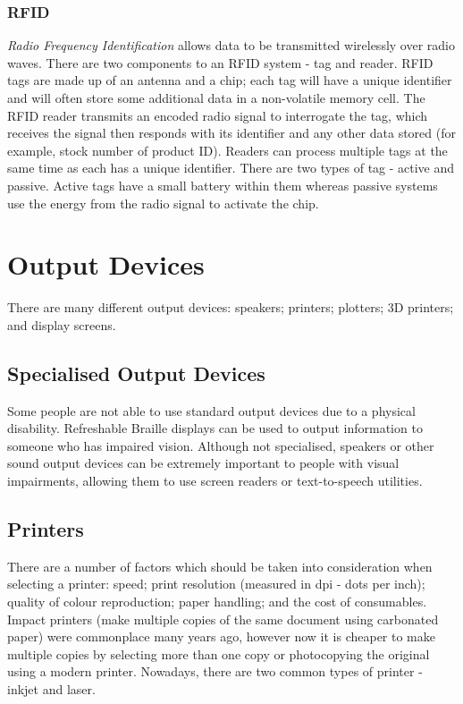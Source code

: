 \documentclass[a4paper,11pt, twocolumn]{article}
\begin{document}
\subsubsection{RFID}
\textit{Radio Frequency Identification} allows data to be transmitted wirelessly over radio waves. There are two components to an RFID system - tag and reader. RFID tags are made up of an antenna and a chip; each tag will have a unique identifier and will often store some additional data in a non-volatile memory cell. The RFID reader transmits an encoded radio signal to interrogate the tag, which receives the signal then responds with its identifier and any other data stored (for example, stock number of product ID). Readers can process multiple tags at the same time as each has a unique identifier. There are two types of tag - active and passive. Active tags have a small battery within them whereas passive systems use the energy from the radio signal to activate the chip. 

\section{Output Devices}
There are many different output devices: speakers; printers; plotters; 3D printers; and display screens.
\subsection{Specialised Output Devices}
Some people are not able to use standard output devices due to a physical disability. Refreshable Braille displays can be used to output information to someone who has impaired vision. Although not specialised, speakers or other sound output devices can be extremely important to people with visual impairments, allowing them to use screen readers or text-to-speech utilities. 
\subsection{Printers}
There are a number of factors which should be taken into consideration when selecting a printer: speed; print resolution (measured in dpi - dots per inch); quality of colour reproduction; paper handling; and the cost of consumables. Impact printers (make multiple copies of the same document using carbonated paper) were commonplace many years ago, however now it is cheaper to make multiple copies by selecting more than one copy or photocopying the original using a modern printer. Nowadays, there are two common types of printer - inkjet and laser.
\end{document}
